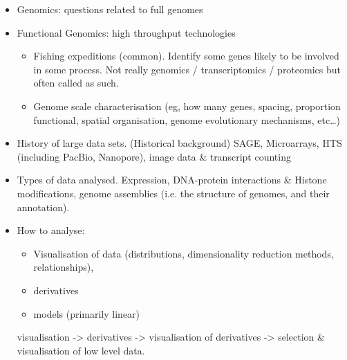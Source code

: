 \documentclass{scrartcl}
\begin{document}
\begin{itemize}
\item Genomics: questions related to full genomes
\item Functional Genomics: high throughput technologies
\begin{itemize}
\item Fishing expeditions (common). Identify some genes likely to be involved in some process.
    Not really genomics / transcriptomics / proteomics but often called as such.
\item Genome scale characterisation (eg, how many genes, spacing, proportion functional,
    spatial organisation, genome evolutionary mechanisms, etc\ldots{})
\end{itemize}
\item History of large data sets. (Historical background)
  SAGE, Microarrays, HTS (including PacBio, Nanopore), image data \& transcript counting
\item Types of data analysed.
  Expression, DNA-protein interactions \& Histone modifications, genome assemblies (i.e.
  the structure of genomes, and their annotation).
\item How to analyse:
\begin{itemize}
\item Visualisation of data (distributions, dimensionality reduction methods, relationships),
\item derivatives
\item models (primarily linear)
\end{itemize}
visualisation -> derivatives -> visualisation of derivatives -> selection \& visualisation
  of low level data.
\end{itemize}
\end{document}
